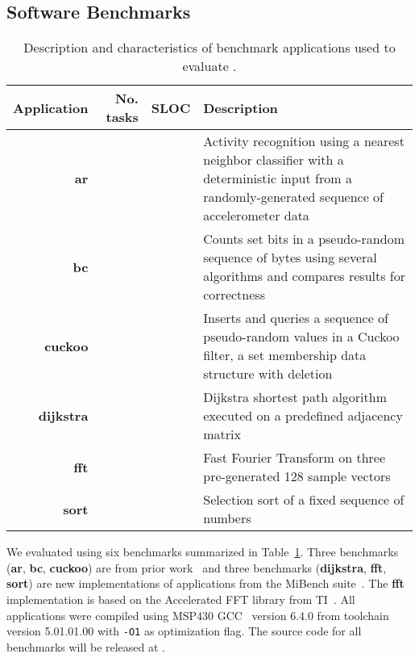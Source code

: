 \subsection{Software Benchmarks}
\label{sec:software_benchmarks}

\begin{table}
	\centering
	\footnotesize
	\begin{tabular}{| r|r|r | p{} |}
		\hline
		Application & No. tasks & SLOC & Description \\
		\hline\hline
        \textbf{ar} & & & Activity recognition using a nearest neighbor
classifier with a deterministic input from a randomly-generated sequence of
accelerometer data\\
		\hline
        \textbf{bc} & & & Counts set bits in a pseudo-random sequence of bytes
using several algorithms and compares results for correctness\\
		\hline
        \textbf{cuckoo} & & & Inserts and queries a sequence of pseudo-random
values in a Cuckoo filter, a set membership data structure with deletion\\
		\hline
        \textbf{dijkstra} &  & & Dijkstra shortest path algorithm executed on a
predefined adjacency matrix\\
		\hline
        \textbf{fft} & & & Fast Fourier Transform on three pre-generated 128
sample vectors\\
		\hline
		\textbf{sort} & & & Selection sort of a fixed sequence of numbers\\
		\hline
	\end{tabular}
\caption{Description and characteristics of benchmark applications used to
evaluate \sys.}
\label{table:benchmark_table}
\end{table}

We evaluated \sys using six benchmarks summarized in
Table~\ref{table:benchmark_table}. %
Three benchmarks (\textbf{ar}, \textbf{bc}, \textbf{cuckoo}) are from prior
work~\cite{chain,alpaca} and three benchmarks (\textbf{dijkstra},
\textbf{fft}, \textbf{sort}) are new implementations of applications
from the MiBench suite~\cite{mibench,hicks_mibench2_2016}. The
\textbf{fft} implementation is based on the Accelerated FFT library from
TI~\cite{ti_dsp}. All applications were compiled using MSP430 GCC~\cite{ti-gcc} version 6.4.0
from toolchain version 5.01.01.00 with \texttt{-O1} as optimization flag.
%
The source code for all benchmarks will be released at \cite{coala_website}.


